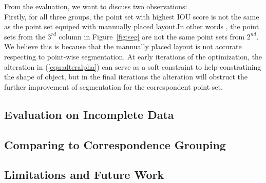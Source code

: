 From the evaluation, we want to discuss two observations:\\
Firstly, for all three groups, the point set with highest IOU score is not the same as the point set equiped with mannually placed layout.In other words , the point sets from the $3^{rd}$ column in Figure~\ref{fig:seg} are not the same point sets from $2^{nd}$. We believe this is because that the mannually placed layout is not accurate respecting to point-wise segmentation. At early iterations of the optimization, the alteration in (\ref{equ:alteralpha}) can serve as a soft constraint to help constratining the shape of object, but in the final iterations the alteration will obstruct the further improvement of segmentation for the correspondent point set. 
\subsection{Evaluation on Incomplete Data} 
\subsection{Comparing to Correspondence Grouping}
\subsection{Limitations and Future Work}
